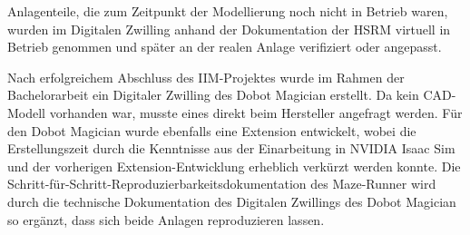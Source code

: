 Anlagenteile, die zum Zeitpunkt der Modellierung noch nicht in Betrieb waren, wurden
im Digitalen Zwilling anhand der Dokumentation der HSRM virtuell in
Betrieb genommen und später an der realen Anlage verifiziert oder angepasst.

Nach erfolgreichem Abschluss des IIM-Projektes wurde im Rahmen der Bachelorarbeit
ein Digitaler Zwilling des Dobot Magician erstellt.
Da kein CAD-Modell vorhanden war, musste eines direkt beim Hersteller angefragt werden.
Für den Dobot Magician wurde ebenfalls eine Extension entwickelt, wobei die Erstellungszeit
durch die Kenntnisse aus der Einarbeitung in NVIDIA Isaac Sim und der vorherigen Extension-Entwicklung
erheblich verkürzt werden konnte.
Die Schritt-für-Schritt-Reproduzierbarkeitsdokumentation des Maze-Runner wird durch die technische Dokumentation
des Digitalen Zwillings des Dobot Magician so ergänzt, dass sich beide Anlagen
reproduzieren lassen.
\fi
